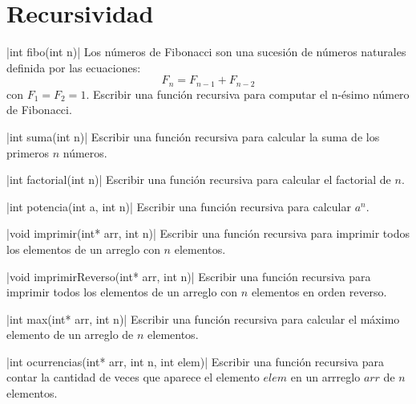 \documentclass[titlepage,oneside]{book}
\begin{document}
\chapter{Recursividad}

	\begin{Exercise}
		|int fibo(int n)|
	    Los números de Fibonacci son una sucesión de números naturales definida por las ecuaciones:
    	$$F_n = F_{n-1} + F_{n-2}$$ con $F_1 = F_2 = 1$. Escribir una función recursiva para computar el n-ésimo número de Fibonacci.
    \end{Exercise}

	\begin{Exercise}
		|int suma(int n)|
	    Escribir una función recursiva para calcular la suma de los primeros $n$ números.
	\end{Exercise}

	\begin{Exercise}
		|int factorial(int n)|
    	Escribir una función recursiva para calcular el factorial de $n$.
    \end{Exercise}

	\begin{Exercise}
		|int potencia(int a, int n)|
        Escribir una función recursiva para calcular $a^n$.
    \end{Exercise}

	\begin{Exercise}
		|void imprimir(int* arr, int n)|
        Escribir una función recursiva para imprimir todos los elementos de un arreglo con $n$ elementos.
    \end{Exercise}

	\begin{Exercise}
		|void imprimirReverso(int* arr, int n)|
        Escribir una función recursiva para imprimir todos los elementos de un arreglo con $n$ elementos en orden reverso.
    \end{Exercise}

	\begin{Exercise}
		|int max(int* arr, int n)|
         Escribir una función recursiva para calcular el máximo elemento de un arreglo de $n$ elementos.
    \end{Exercise}

	\begin{Exercise}
		|int ocurrencias(int* arr, int n, int elem)|
        Escribir una función recursiva para contar la cantidad de veces que aparece el elemento $elem$ en un arrreglo $arr$ de $n$ elementos.
	\end{Exercise}
\end{document}

